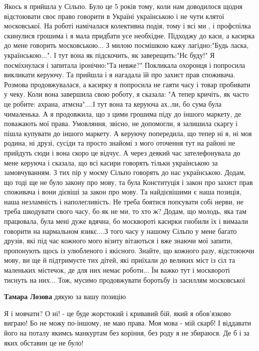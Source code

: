 \begin{itemize}
Якось я прийшла у Сільпо. Було це 5 років тому, коли нам доводилося щодня
відстоювати своє право говорити в Україні українською і не чути клятої
московської. На роботі намічалася колективна подія, тому і всі ми , і
профспілка скинулися грошима і я мала придбати усе необхідне. Підходжу до каси,
а касирка до мене говорить московською... З милою посмішкою кажу лагідно:"Будь
ласка, українською...". І тут вона як підскочить, як заверещить:"Нє буду!" Я
посміхнулася і запитала іронічно:"Та невже?" Покликала охоронця і попросила
викликати керуючу. Та прийшла і я нагадала їй про захист прав споживача.
Розмова продовжувалася, а касирку я попросила не гаяти часу і товар пробивати у
чеку. Коли вона завершила свою роботу, я сказала: "А тепер кричіть, як часто це
робите: ахрана, атмєна"....І тут вона та керуюча ах..ли, бо сума була
чималенька. А я продовжила, що з цими грошима піду до іншого маркету, де
поважають мої права. Умовляння, звісно, не допомогли, я залишила скаргу і пішла
купувати до іншого маркету. А керуючу попередила, що тепер ні я, ні моя родина,
ні друзі, сусіди та просто знайомі з мого оточення тут на районі не прийдуть
сюди і вона скоро це відчує. А через деякий час зателефонувала до мене керуюча
і сказала, що всі касири говорять тільки українською за замовчуванням. З тих
пір у моєму Сільпо говорять до нас українською. Додам, що тоді ще не було
закону про мову, та була Конституція і закон про захист прав споживача і вони
дієвіші за закон про мову. Та найдієвішими є наша позиція, наша незламність і
наполегливість. Не треба боятися попсувати собі нерви, не треба шкодувати свого
часу, бо як не ми, то хто ж? Додам, що молодь, яка там працювала, була мені
дуже вдячна, бо москвороті касирки гнобили їх і вимаали говорити на нармальном
язикє....З того часу у нашому Сільпо у мене багато друзів, які під час кожного
мого візиту вітаються і вже знаючи мої запити, пропонують щось із улюбленого і
якісного. Знайте, що кожного разу, відстоюючи мову, ви ще й підтримуєте тих
дітей, які приїхали до великих міст із сіл та маленьких містечок, де для них
немає роботи... Їм важко тут і москвороті тиснуть на них... Тож, мусимо
продовжувати боротьбу із засиллям московської

\begin{itemize}
 
\textbf{Тамара Лозова} дякую за вашу позицію
\end{itemize}

 

Я і мовчати? О ні! - це буде жорстокий і кривавий бій, який я обов'язково
виграю! Бо не можу по-іншому, не маю права. Моя мова - мій скарб! І віддавати
його на поталу якимсь манкуртам без коріння, без роду я не збираюся. Де б і за
яких обставин це не було!
\end{itemize}

